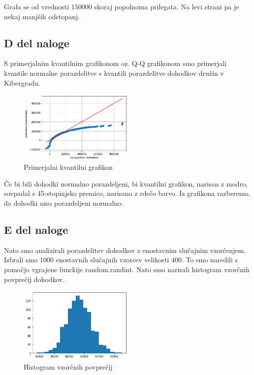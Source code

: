 \documentclass{article}
\begin{document}
Grafa se od vrednosti $150000$ skoraj popolnoma prilegata. Na levi strani pa je nekaj manjših odstopanj.


\subsection{D del naloge}
S primerjalnim kvantilnim grafikonom oz. Q-Q grafikonom smo primerjali kvantile normalne porazdelitve s kvantili 
porazdelitve dohodkov družin v Kibergradu.
\begin{figure}[H]
    \begin{center}
        \includegraphics*[width=0.5\textwidth]{figure1D.png}
        \caption{Primerjalni kvantilni grafikon}
        \label{QQ}
    \end{center}
\end{figure}

Če bi bili dohodki normalno porazdeljeni, bi kvantilni grafikon, narisan z modro, sovpadal s 45-stopinjsko premico,
narisano z rdečo barvo. Iz grafikona razberemo, da dohodki niso porazdeljeni normalno.

\subsection{E del naloge}
Nato smo analizirali porazdelitev dohodkov z enostavnim slučajnim vzorčenjem. Izbrali smo $1000$ enostavnih
slučajnih vzorcev velikosti $400$. To smo naredili s pomočjo vgrajene funckije random.randint. 
Nato smo narisali histogram vzorčnih povprečij dohodkov.
\begin{figure}[H]
    \begin{center}
        \includegraphics*[width=0.5\textwidth]{figure1E.png}
        \caption{Histogram vzorčnih povprečij}
        \label{hist_vzor}
    \end{center}
\end{figure}
\end{document}
